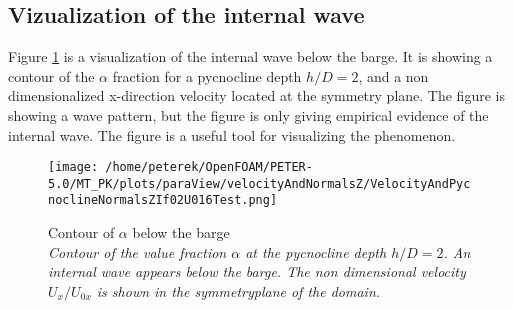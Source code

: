 \documentclass[a4paper, 12pt]{report}
\begin{document}
\subsection{Vizualization of the internal wave}
Figure \ref{fig:velocityAndPycnoclineIf02U016Test} is a visualization of the internal wave below the barge. It is showing a contour of the $\alpha$ fraction for a pycnocline depth $h/D=2$, and a non dimensionalized x-direction velocity located at the symmetry plane. The figure is showing a wave pattern, but the figure is only giving empirical evidence of the internal wave. The figure is a useful tool for visualizing the phenomenon. 
\begin{figure}[H]
	\centering
	\texttt{[image: /home/peterek/OpenFOAM/PETER-5.0/MT\_PK/plots/paraView/velocityAndNormalsZ/VelocityAndPycnoclineNormalsZIf02U016Test.png]}
	\caption{Contour of $\alpha$ below the barge \\ \textit{Contour of the value fraction $\alpha$ at the pycnocline depth $h/D=2$. An internal wave appears below the barge. The non dimensional velocity $U_x/U_{0x}$ is shown in the symmetryplane of the domain.}}
	\label{fig:velocityAndPycnoclineIf02U016Test}
\end{figure}
\end{document}
